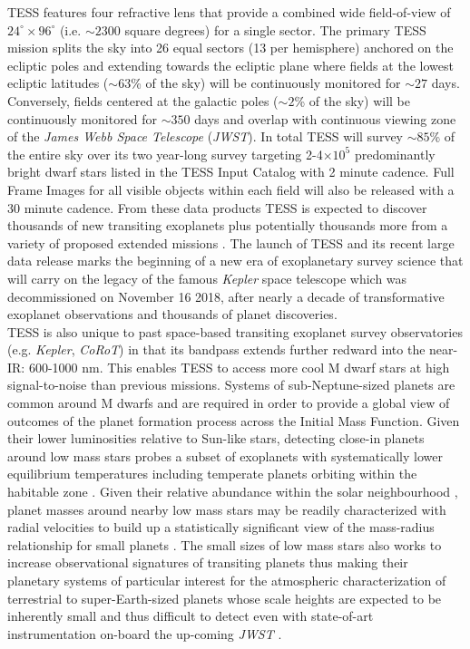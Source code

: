 TESS features four refractive lens that provide a combined wide field-of-view of
$24^{\circ} \times 96^{\circ}$ (i.e. $\sim 2300$ square degrees) for a single sector. The primary
TESS mission splits the sky into 26 equal sectors (13 per hemisphere) anchored on the ecliptic
poles and extending towards the ecliptic plane where fields at the lowest ecliptic latitudes
($\sim 63$\% of the sky) will be continuously monitored for $\sim 27$ days. Conversely, fields
centered at the galactic poles ($\sim 2$\% of the sky) will be continuously monitored for
$\sim 350$ days and overlap with continuous viewing zone of the \emph{James Webb Space Telescope}
(\emph{JWST}). In total  
TESS will survey $\sim 85$\% of the entire sky over its two year-long survey targeting
2-4$\times 10^5$ predominantly bright dwarf stars listed in the TESS Input Catalog
\citep[TIC;][]{stassun17} with 2 minute cadence.
Full Frame Images for all visible objects within each field will also be released with a 30 minute
cadence. From these data products TESS
is expected to discover thousands of new transiting exoplanets 
\citep{sullivan15,ballard18,barclay18} plus potentially thousands more from a variety of proposed
extended missions \citep{bouma17,huang18b}. The launch of TESS
and its recent large data release marks the beginning of a new era of exoplanetary survey
science that will carry on the legacy of the famous \emph{Kepler} space telescope which was
decommissioned on November 16 2018, after nearly a decade of transformative exoplanet observations
and thousands of planet discoveries. \\

TESS is also unique to past space-based transiting exoplanet survey observatories
(e.g. \emph{Kepler}, \emph{CoRoT}) in that its bandpass extends further redward into the near-IR:
600-1000 nm. This enables TESS to access more cool M dwarf stars at high signal-to-noise
than previous missions. Systems of sub-Neptune-sized planets are common around M dwarfs
\citep{dressing13,morton14,dressing15a} and are required in order to provide a global view of
outcomes of the planet formation process across the Initial Mass Function.
Given their lower luminosities relative
to Sun-like stars, detecting close-in planets around low mass stars probes a subset of exoplanets
with systematically lower equilibrium temperatures including temperate planets orbiting
within the habitable zone \citep{kasting93,kopparapu13}. Given their relative
abundance within the solar neighbourhood \citep{winters15}, planet masses around nearby low mass
stars may be
readily characterized with radial velocities to build up a statistically significant view of the
mass-radius relationship for small planets \citep{weiss14,rogers15,wolfgang16,chen17}. The small sizes
of low mass stars also works to
increase observational signatures of transiting planets thus making their planetary systems of
particular interest for the atmospheric characterization of terrestrial to super-Earth-sized planets
whose scale heights are expected to be inherently small \citep[$\lesssim$][]{millerricci09}
and thus difficult to detect even with state-of-art instrumentation on-board the up-coming
\emph{JWST} \citep{morley17}. \\

